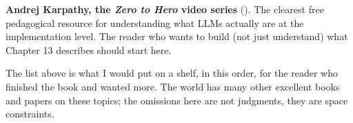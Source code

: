 \textbf{Andrej Karpathy, the \emph{Zero to Hero} video series} (). The clearest free pedagogical resource for understanding what LLMs actually are at the implementation level. The reader who wants to build (not just understand) what Chapter 13 describes should start here.

\medskip

\noindent The list above is what I would put on a shelf, in this order, for the reader who finished the book and wanted more. The world has many other excellent books and papers on these topics; the omissions here are not judgments, they are space constraints.
